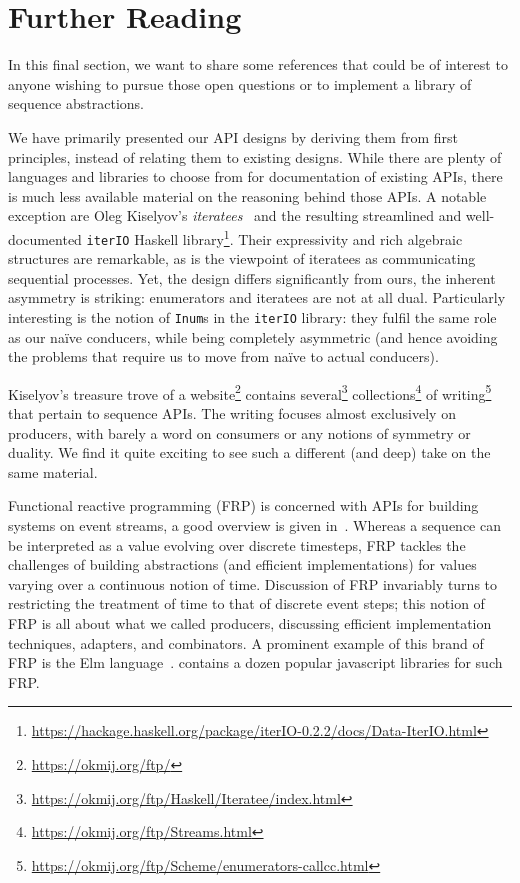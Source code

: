 \documentclass[sigplan,screen,10pt,review]{acmart}
\begin{document}
\section{Further Reading}

In this final section, we want to share some references that could be of interest to anyone wishing to pursue those open questions or to implement a library of sequence abstractions.

We have primarily presented our API designs by deriving them from first principles, instead of relating them to existing designs. While there are plenty of languages and libraries to choose from for documentation of existing APIs, there is much less available material on the reasoning behind those APIs. A notable exception are Oleg Kiselyov's \textit{iteratees}~\cite{kiselyov2012iteratees} and the resulting streamlined and well-documented \texttt{iterIO} Haskell library\footnote{\url{https://hackage.haskell.org/package/iterIO-0.2.2/docs/Data-IterIO.html}}. Their expressivity and rich algebraic structures are remarkable, as is the viewpoint of iteratees as communicating sequential processes. Yet, the design differs significantly from ours, the inherent asymmetry is striking: enumerators and iteratees are not at all dual. Particularly interesting is the notion of \texttt{Inum}s in the \texttt{iterIO} library: they fulfil the same role as our naïve conducers, while being completely asymmetric (and hence avoiding the problems that require us to move from naïve to actual conducers).

Kiselyov's treasure trove of a website\footnote{\url{https://okmij.org/ftp/}} contains several\footnote{\url{https://okmij.org/ftp/Haskell/Iteratee/index.html}} collections\footnote{\url{https://okmij.org/ftp/Streams.html}} of writing\footnote{\url{https://okmij.org/ftp/Scheme/enumerators-callcc.html}} that pertain to sequence APIs. The writing focuses almost exclusively on producers, with barely a word on consumers or any notions of symmetry or duality. We find it quite exciting to see such a different (and deep) take on the same material.

Functional reactive programming (FRP) is concerned with APIs for building systems on event streams, a good overview is given in~\cite{perez2016functional}. Whereas a sequence can be interpreted as a value evolving over discrete timesteps, FRP tackles the challenges of building abstractions (and efficient implementations) for values varying over a continuous notion of time. Discussion of FRP invariably turns to restricting the treatment of time to that of discrete event steps; this notion of FRP is all about what we called producers, discussing efficient implementation techniques, adapters, and combinators. A prominent example of this brand of FRP is the Elm language~\cite{czaplicki2013asynchronous}.  contains a dozen popular javascript libraries for such FRP. 
\end{document}
